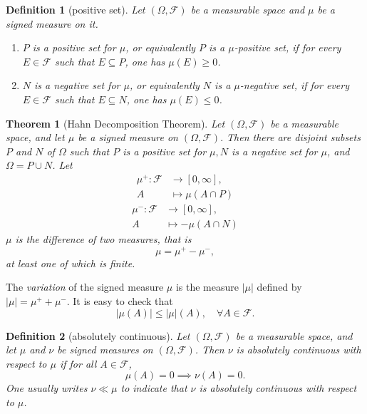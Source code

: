 \documentclass{report}
\newtheorem{definition}{Definition}[section]
\newtheorem{theorem}{Theorem}[section]
\theoremstyle{nonumberplain}
\begin{document}
\begin{definition}[positive set]
Let $(\Omega, \mathcal{F})$ be a measurable space and $\mu$ be a signed measure on it.
\begin{enumerate}
	\item $P$ is a \emph{positive set} for $\mu$, or equivalently $P$ is a \emph{$\mu$-positive set}, if for every $E \in \mathcal{F}$ such that $E \subseteq P$, one has $\mu(E) \geq 0$. 
	\item $N$ is a \emph{negative set} for $\mu$, or equivalently $N$ is a \emph{$\mu$-negative set}, if for every $E \in \mathcal{F}$ such that $E \subseteq N$, one has $\mu(E) \leq 0$. 
\end{enumerate}
\end{definition}

\begin{theorem}[Hahn Decomposition Theorem]
	Let $(\Omega, \mathcal{F})$ be a measurable space, and let $\mu$ be a signed measure on $(\Omega, \mathcal{F}) .$ Then there are disjoint subsets $P$ and $N$ of $\Omega$ such that $P$ is a positive set for $\mu, N$ is a negative set for $\mu$, and $\Omega=P \cup N$. Let
	\begin{align*}
		\mu^+:\mathcal{F}&\longrightarrow [0,\infty],\\
		A &\longmapsto\mu(A\cap P)
	\end{align*}
	\begin{align*}
		\mu^-:\mathcal{F}&\longrightarrow [0,\infty],\\
		A &\longmapsto-\mu(A\cap N)
	\end{align*}
	$\mu$ is the difference of two measures, that is
	\[
	\mu=\mu^+-\mu^-,
	\]
	at least one of which is finite.
\end{theorem} 

The \emph{variation} of the signed measure $\mu$ is the measure $|\mu|$ defined by $|\mu|=\mu^{+}+\mu^{-}$. It is easy to check that
\[
|\mu(A)| \leq|\mu|(A),\quad\forall A\in\mathcal{F}.
\]

\begin{definition}[absolutely continuous]
Let $(\Omega, \mathcal{F})$ be a measurable space, and let $\mu$ and $\nu$ be signed measures on $(\Omega, \mathcal{F})$. Then $\nu$ is \emph{absolutely continuous} with respect to $\mu$ if for all $A\in\mathcal{F}$,
\[
\mu(A)=0\implies \nu(A)=0.
\]
One usually writes $\nu \ll \mu$ to indicate that $\nu$ is absolutely continuous with respect to $\mu$.
\end{definition}
\end{document}
